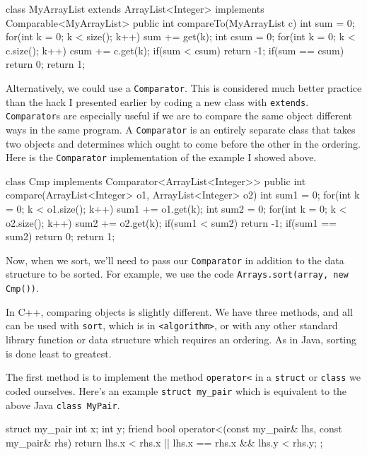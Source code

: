 \begin{mylstlisting}
class MyArrayList extends ArrayList<Integer> implements Comparable<MyArrayList> {
	public int compareTo(MyArrayList c) {
		int sum = 0;
		for(int k = 0; k < size(); k++) {
			sum += get(k);
		}
		int csum = 0;
		for(int k = 0; k < c.size(); k++) {
			csum += c.get(k);
		}
		if(sum < csum) return -1;
		if(sum == csum) return 0;
		return 1;
	}
}
\end{mylstlisting}

Alternatively, we could use a \texttt{Comparator}. This is considered much better practice than the hack I presented earlier by coding a new class with \texttt{extends}. \texttt{Comparator}s are especially useful if we are to compare the same object different ways in the same program. A \texttt{Comparator} is an entirely separate class that takes two objects and determines which ought to come before the other in the ordering. Here is the \texttt{Comparator} implementation of the example I showed above.

\begin{mylstlisting}
class Cmp implements Comparator<ArrayList<Integer>> {
	public int compare(ArrayList<Integer> o1, ArrayList<Integer> o2) {
		int sum1 = 0;
		for(int k = 0; k < o1.size(); k++) {
			sum1 += o1.get(k);
		}
		int sum2 = 0;
		for(int k = 0; k < o2.size(); k++) {
			sum2 += o2.get(k);
		}
		if(sum1 < sum2) return -1;
		if(sum1 == sum2) return 0;
		return 1;
	}
}
\end{mylstlisting}

Now, when we sort, we'll need to pass our \texttt{Comparator} in addition to the data structure to be sorted. For example, we use the code \texttt{Arrays.sort(array, new Cmp())}.

In C++, comparing objects is slightly different. We have three methods, and all can be used with \texttt{sort}, which is in \texttt{<algorithm>}, or with any other standard library function or data structure which requires an ordering. As in Java, sorting is done least to greatest.

The first method is to implement the method \texttt{operator<} in a \texttt{struct} or \texttt{class} we coded ourselves. Here's an example \texttt{struct my\_pair} which is equivalent to the above Java \texttt{class MyPair}.

\begin{mylstlisting}[language=C++]
struct my_pair {
	int x;
	int y;
	friend bool operator<(const my_pair& lhs, const my_pair& rhs) {
		return lhs.x < rhs.x || lhs.x == rhs.x && lhs.y < rhs.y;
    }
};
\end{mylstlisting}

